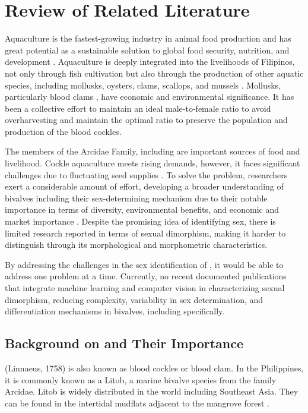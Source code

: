 \chapter{Review of Related Literature}
\label{sec:relatedlit}

Aquaculture is the fastest-growing industry in animal food production and has great potential as a sustainable solution to global food security, nutrition, and development \cite{fao2024}. Aquaculture is deeply integrated into the livelihoods of Filipinos, not only through fish cultivation but also through the production of other aquatic species, including mollusks, oysters, clams, scallops, and mussels \cite{breton2017sex}. Mollusks, particularly blood clams \Tegillarcagranosa, have economic and environmental significance. It has been a collective effort to maintain an ideal male-to-female ratio to avoid overharvesting and maintain the optimal ratio to preserve the population and production of the blood cockles. 
	
The members of the Arcidae Family, including \Tgranosa are important sources of food and livelihood. Cockle aquaculture meets rising demands, however, it faces significant challenges due to fluctuating seed supplies \cite{miranda2023}. To solve the problem, researchers exert a considerable amount of effort, developing a broader understanding of bivalves including their sex-determining mechanism due to their notable importance in terms of diversity, environmental benefits, and economic and market importance \cite{breton2017sex}. Despite the promising idea of identifying sex, there is limited research reported in terms of sexual dimorphism, making it harder to distinguish through its morphological and morphometric characteristics. 

By addressing the challenges in the sex identification of \Tgranosa, it would be able to address one problem at a time. Currently, no recent documented publications that integrate machine learning and computer vision in characterizing sexual dimorphism, reducing complexity, variability in sex determination, and differentiation mechanisms in bivalves, including \Tgranosa specifically.

\section{Background on \textit{\Tegillarcagranosa} and Their Importance}
\textit{\Tegillarcagranosa}(Linnaeus, 1758) is also known as blood cockles or blood clam. In the Philippines, it is commonly known as a Litob, a marine bivalve species from the family Arcidae. Litob is widely distributed in the world including Southeast Asia. They can be found in the intertidal mudflats adjacent to the mangrove forest \cite{srisunont2020}.

